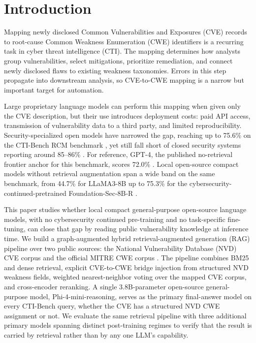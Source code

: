 \section{Introduction}

Mapping newly disclosed Common Vulnerabilities and Exposures (CVE) records to root-cause Common Weakness Enumeration (CWE) identifiers is a recurring task in cyber threat intelligence (CTI). The mapping determines how analysts group vulnerabilities, select mitigations, prioritize remediation, and connect newly disclosed flaws to existing weakness taxonomies. Errors in this step propagate into downstream analysis, so CVE-to-CWE mapping is a narrow but important target for automation.

Large proprietary language models can perform this mapping when given only the CVE description, but their use introduces deployment costs: paid API access, transmission of vulnerability data to a third party, and limited reproducibility. Security-specialized open models have narrowed the gap, reaching up to 75.6\% on the CTI-Bench RCM benchmark \cite{mosievskiy-2026}, yet still fall short of closed security systems reporting around 85--86\% \cite{google-2025a,google-2025b}. For reference, GPT-4, the published no-retrieval frontier anchor for this benchmark, scores 72.0\% \cite{alam-2024}. Local open-source compact models without retrieval augmentation span a wide band on the same benchmark, from 44.7\% for LLaMA3-8B \cite{alam-2024} up to 75.3\% for the cybersecurity-continued-pretrained Foundation-Sec-8B-R \cite{yang-2026}.

This paper studies whether local compact general-purpose open-source language models, with no cybersecurity continued pre-training and no task-specific fine-tuning, can close that gap by reading public vulnerability knowledge at inference time. We build a graph-augmented hybrid retrieval-augmented generation (RAG) pipeline over two public sources: the National Vulnerability Database (NVD) CVE corpus \cite{national-2024} and the official MITRE CWE corpus \cite{mitre-2024a}. The pipeline combines BM25 and dense retrieval, explicit CVE-to-CWE bridge injection from structured NVD weakness fields, weighted nearest-neighbor voting over the mapped CVE corpus, and cross-encoder reranking. A single 3.8B-parameter open-source general-purpose model, Phi-4-mini-reasoning, serves as the primary final-answer model on every CTI-Bench query, whether the CVE has a structured NVD CWE assignment or not. We evaluate the same retrieval pipeline with three additional primary models spanning distinct post-training regimes to verify that the result is carried by retrieval rather than by any one LLM's capability.

